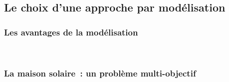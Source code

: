 \subsection{Le choix d’une approche par modélisation} %
\label{sub:le_choix_d_une_approche_par_modelisation}
\subsubsection{Les avantages de la modélisation} %
\label{ssub:les_avantages_de_la_modelisation}
~



\subsubsection{La maison solaire~: un problème multi-objectif} %
\label{ssub:la_maison_solaire_un_probleme_multi_objectif}
~





























